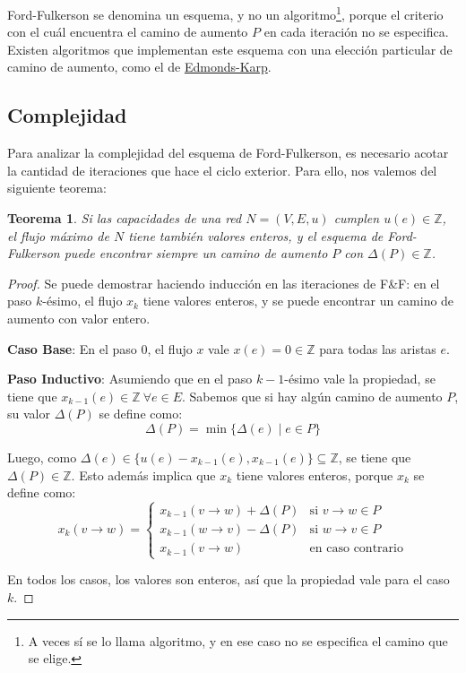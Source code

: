 \documentclass[a4paper]{report}
\newcommand{\si}{\text{si }}
\newcommand{\ecc}{\text{en caso contrario}}
\newcommand{\Z}{\mathbb{Z}}
\newtheorem*{theorem*}{Teorema}
\begin{document}
Ford-Fulkerson se denomina un esquema, y no un algoritmo\footnote{A veces sí se lo llama algoritmo, y en ese caso no se especifica el camino que se elige.}, porque el criterio con el cuál encuentra el camino de aumento $P$ en cada iteración no se especifica. Existen algoritmos que implementan este esquema con una elección particular de camino de aumento, como el de \hyperref[edmonds-karp]{Edmonds-Karp}.

\subsection{Complejidad}
Para analizar la complejidad del esquema de Ford-Fulkerson, es necesario acotar la cantidad de iteraciones que hace el ciclo exterior. Para ello, nos valemos del siguiente teorema:

\begin{theorem*}
    Si las capacidades de una red $N = (V, E, u)$ cumplen $u(e) \in \Z$, el flujo máximo de $N$ tiene también valores enteros, y el esquema de \textit{Ford-Fulkerson} puede encontrar siempre un camino de aumento $P$ con $\Delta(P) \in \Z$.
\end{theorem*}
\begin{proof}
    Se puede demostrar haciendo inducción en las iteraciones de F\&F: en el paso $k$-ésimo, el flujo $x_k$ tiene valores enteros, y se puede encontrar un camino de aumento con valor entero.

    \textbf{Caso Base}: En el paso $0$, el flujo $x$ vale $x(e) = 0 \in \Z$ para todas las aristas $e$.

    \textbf{Paso Inductivo}: Asumiendo que en el paso $k - 1$-ésimo vale la propiedad, se tiene que $x_{k - 1}(e) \in \Z\ \forall e \in E$. Sabemos que si hay algún camino de aumento $P$, su valor $\Delta(P)$ se define como:
    $$\Delta(P) = \min{\{\Delta(e) \mid e \in P\}}$$

    Luego, como $\Delta(e) \in \{u(e) - x_{k - 1}(e), x_{k - 1}(e)\} \subseteq \Z$, se tiene que $\Delta(P) \in \Z$. Esto además implica que $x_k$ tiene valores enteros, porque $x_k$ se define como:
    $$
    x_k(v \rightarrow w) =
    \begin{cases}
        x_{k - 1}(v \rightarrow w) + \Delta(P) & \si v \rightarrow w \in P \\
        x_{k - 1}(w \rightarrow v) - \Delta(P) & \si w \rightarrow v \in P \\
        x_{k - 1}(v \rightarrow w) & \ecc
    \end{cases}$$

    En todos los casos, los valores son enteros, así que la propiedad vale para el caso $k$.

\end{proof}
\end{document}
